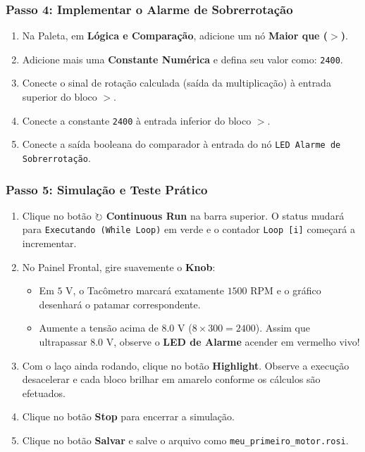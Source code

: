 \documentclass[11pt,a4paper]{article}
\begin{document}
\subsubsection{Passo 4: Implementar o Alarme de Sobrerrotação}
\begin{enumerate}
    \item Na Paleta, em \textbf{Lógica e Comparação}, adicione um nó \textbf{Maior que ($>$)}.
    \item Adicione mais uma \textbf{Constante Numérica} e defina seu valor como: \texttt{2400}.
    \item Conecte o sinal de rotação calculada (saída da multiplicação) à entrada superior do bloco $>$.
    \item Conecte a constante \texttt{2400} à entrada inferior do bloco $>$.
    \item Conecte a saída booleana do comparador à entrada do nó \texttt{LED Alarme de Sobrerrotação}.
\end{enumerate}

\subsubsection{Passo 5: Simulação e Teste Prático}
\begin{enumerate}
    \item Clique no botão \textbf{$\circlearrowright$ Continuous Run} na barra superior. O status mudará para \texttt{Executando (While Loop)} em verde e o contador \texttt{Loop [i]} começará a incrementar.
    \item No Painel Frontal, gire suavemente o \textbf{Knob}:
    \begin{itemize}
        \item Em $5\text{ V}$, o Tacômetro marcará exatamente $1500\text{ RPM}$ e o gráfico desenhará o patamar correspondente.
        \item Aumente a tensão acima de $8.0\text{ V}$ ($8 \times 300 = 2400$). Assim que ultrapassar $8.0\text{ V}$, observe o \textbf{LED de Alarme} acender em vermelho vivo!
    \end{itemize}
    \item Com o laço ainda rodando, clique no botão \textbf{Highlight}. Observe a execução desacelerar e cada bloco brilhar em amarelo conforme os cálculos são efetuados.
    \item Clique no botão \textbf{Stop} para encerrar a simulação.
    \item Clique no botão \textbf{Salvar} e salve o arquivo como \texttt{meu\_primeiro\_motor.rosi}.
\end{enumerate}
\end{document}
